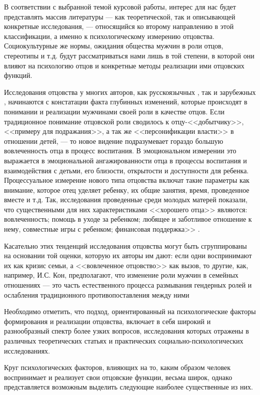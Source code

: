 \documentclass{../../common/thesisbyxetex}
\begin{document}
В соответствии с выбранной темой курсовой работы, интерес для нас будет представлять массив 
литературы --- как теоретической, так и описывающей конкретные исследования, --- относящийся ко 
второму направлению в этой классификации, а именно к психологическому измерению отцовства. 
Социокультурные же нормы, ожидания общества мужчин в роли отцов, стереотипы и т.д. будут 
рассматриваться нами лишь в той степени, в которой они влияют на психологию отцов и конкретные 
методы реализации ими отцовских функций.

Исследования отцовства у многих авторов, как русскоязычных \cite{relot, psyot}, так и зарубежных 
\cite{meta, morfat, legfat}, начинаются с констатации факта глубинных изменений, которые происходят 
в понимании и реализации мужчинами своей роли в качестве отцов. Если традиционное понимание 
отцовской роли сводилось к отцу-<<добытчику>>, <<примеру для подражания>>, а так же 
<<персонификации власти>> в отношении детей, --- то новое видение подразумевает гораздо большую 
вовлеченность отца в процесс воспитания. В эмоциональном измерении это выражается в  эмоциональной 
ангажированности отца в процессы воспитания и взаимодействия с детьми, его близости, открытости и 
доступности для ребенка. Процессуальное измерение нового типа отцовства включат такие параметры как 
внимание, которое отец уделяет ребенку, их общие занятия, время, проведенное вместе и т.д. 
Так, исследования проведенные среди молодых матерей показали, что существенными  для них 
характеристиками <<хорошего отца>> являются: вовлеченность; помощь в уходе за ребенком; любящее и 
заботливое отношение к нему, совместные игры с ребенком; финансовая поддержка>> \cite[137]{money}.

Касательно этих тенденций исследования отцовства могут быть сгруппированы на основании той оценки, 
которую их авторы им дают: если одни воспринимают их как кризис семьи, а <<вовлеченное отцовство>> 
как вызов, то другие, как, например, И.С. Кон, предполагают, что изменение роли мужчин в семейных 
отношениях --- это часть естественного процесса размывания гендерных ролей и ослабления 
традиционного противопоставления между ними \cite{konmen}

Необходимо отметить, что подход, ориентированный на психологические факторы формирования и 
реализации отцовства, включает в себя широкий и разнообразный спектр более узких вопросов, 
исследования которых отражены в различных теоретических статьях и практических 
социально-психологических исследованиях. 

Круг психологических факторов, влияющих на то, каким 
образом человек воспринимает и реализует свои отцовские функции, весьма широк, однако 
представляется 
возможным выделить следующие наиболее существенные из них.
\end{document}
